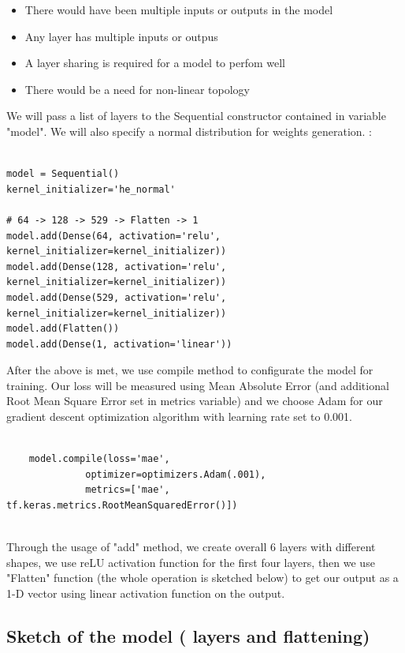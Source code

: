 \documentclass[a4paper,oneside,openright,11pt]{book}
\begin{document}
\begin{itemize}
    \item There would have been multiple inputs or outputs in the model
    \item Any layer has multiple inputs or outpus
    \item A layer sharing is required for a model to perfom well
    \item There would be a need for non-linear topology
\end{itemize}

We will pass a list of layers to the Sequential constructor contained in variable "model". We will also specify a normal distribution for weights generation. :

\begin{verbatim}

model = Sequential()
kernel_initializer='he_normal'

# 64 -> 128 -> 529 -> Flatten -> 1
model.add(Dense(64, activation='relu', kernel_initializer=kernel_initializer))
model.add(Dense(128, activation='relu', kernel_initializer=kernel_initializer))
model.add(Dense(529, activation='relu', kernel_initializer=kernel_initializer))
model.add(Flatten())
model.add(Dense(1, activation='linear'))
\end{verbatim}


After the above is met, we use compile method to configurate the model for training. Our loss will be measured using Mean Absolute Error (and additional Root Mean Square Error set in metrics variable) and we choose Adam for our gradient descent optimization algorithm with learning rate set to 0.001.

\begin{verbatim}
    
    model.compile(loss='mae',
              optimizer=optimizers.Adam(.001),
              metrics=['mae', tf.keras.metrics.RootMeanSquaredError()])
    
\end{verbatim}




Through the usage of "add" method, we create overall 6 layers with different shapes, we use reLU activation function for the first four layers, then we use "Flatten" function (the whole operation is sketched below) to get our output as a 1-D vector using linear activation function on the output. 


\subsection{Sketch of the model ( layers and flattening)}
\end{document}
